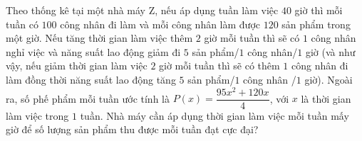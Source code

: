 \begin{vd}%
	Theo thống kê tại một nhà máy Z, nếu áp dụng tuần làm việc $40$ giờ thì mỗi tuần có $100$ công nhân đi làm và mỗi công nhân làm được $120$ sản phẩm trong một giờ. Nếu tăng thời gian làm việc thêm $2$ giờ mỗi tuần thì sẽ có $1$ công nhân nghỉ việc và năng suất lao động giảm đi $5$ sản phẩm/$1$ công nhân/$1$ giờ (và như vậy, nếu giảm thời gian làm việc $2$ giờ mỗi tuần thì sẽ có thêm $1$ công nhân đi làm đồng thời năng suất lao động tăng $5$ sản phẩm/$1$ công nhân /$1$ giờ). Ngoài ra, số phế phẩm mỗi tuần ước tính là $P(x) = \dfrac{95x^2+120x}{4}$, với $x$ là thời gian làm việc trong $1$ tuần. Nhà máy cần áp dụng thời gian làm việc mỗi tuần mấy giờ để số lượng sản phẩm thu được mỗi tuần đạt cực đại?
\end{vd}

